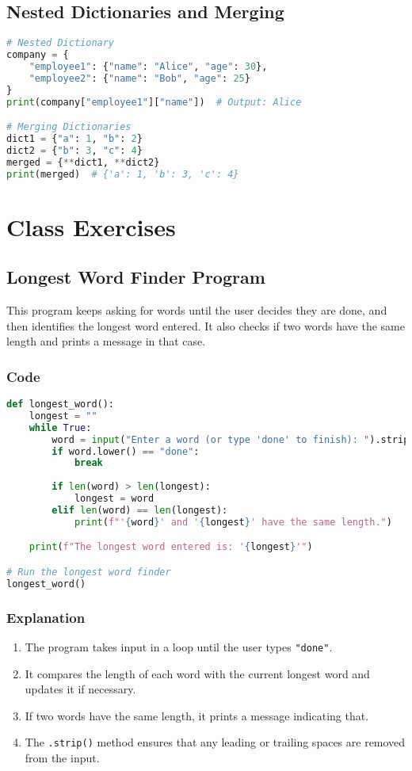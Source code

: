 \documentclass{article}
\begin{document}
\subsection{Nested Dictionaries and Merging}
\begin{lstlisting}[language=Python]
# Nested Dictionary
company = {
    "employee1": {"name": "Alice", "age": 30},
    "employee2": {"name": "Bob", "age": 25}
}
print(company["employee1"]["name"])  # Output: Alice

# Merging Dictionaries
dict1 = {"a": 1, "b": 2}
dict2 = {"b": 3, "c": 4}
merged = {**dict1, **dict2}
print(merged)  # {'a': 1, 'b': 3, 'c': 4}
\end{lstlisting}
\newpage
\section{Class Exercises}
\subsection{Longest Word Finder Program}
This program keeps asking for words until the user decides they are done, and then identifies the longest word entered. It also checks if two words have the same length and prints a message in that case.
\subsubsection{Code}
\begin{lstlisting}[language=Python ]
def longest_word():
    longest = ""
    while True:
        word = input("Enter a word (or type 'done' to finish): ").strip()
        if word.lower() == "done":
            break
        
        if len(word) > len(longest):
            longest = word
        elif len(word) == len(longest):
            print(f"'{word}' and '{longest}' have the same length.")

    print(f"The longest word entered is: '{longest}'")

# Run the longest word finder
longest_word()
\end{lstlisting}
\subsubsection{Explanation}
\begin{enumerate}
    \item The program takes input in a loop until the user types \texttt{"done"}.
    \item It compares the length of each word with the current longest word and updates it if necessary.
    \item If two words have the same length, it prints a message indicating that.
    \item The \texttt{.strip()} method ensures that any leading or trailing spaces are removed from the input.
\end{enumerate}
\newpage
\end{document}

